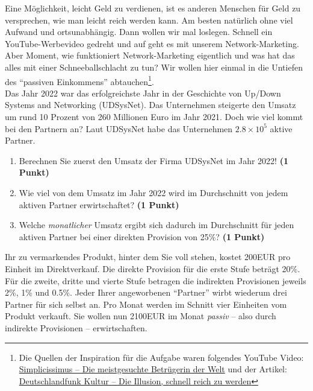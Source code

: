 \documentclass[a4paper, 9pt]{scrartcl}\usepackage[]{graphicx}\usepackage[]{xcolor}
\begin{document}
Eine M{\"o}glichkeit, leicht Geld zu verdienen, ist es anderen Menschen f{\"u}r Geld
zu versprechen, wie man leicht reich werden kann. Am besten nat{\"u}rlich ohne
viel Aufwand und ortsunabh{\"a}ngig. Dann wollen wir mal loslegen. Schnell
ein YouTube-Werbevideo gedreht und auf geht es mit unserem
Network-Marketing. Aber Moment, wie funktioniert Network-Marketing
eigentlich und was hat das alles mit einer Schneeballschlacht zu tun? Wir
wollen hier einmal in die Untiefen des "`passiven Einkommens"'
abtauchen\footnote{Die Quellen der Inspiration f{\"u}r die Aufgabe waren
  folgendes YouTube Video:
  \href{https://youtu.be/UOKkZF_qK9M?si=uf4foJVFKfeQMwSw}{Simplicissimus --
    Die meistgesuchte Betr{\"u}gerin der Welt} und der Artikel:
  \href{https://www.deutschlandfunkkultur.de/netzwerk-marketing-die-illusion-schnell-reich-zu-werden-100.html}{
    Deutschlandfunk Kultur -- Die Illusion, schnell reich zu werden}}.\\

Das Jahr 2022 war das erfolgreichste Jahr in der Geschichte von
Up/Down Systems and Networking (UDSysNet). Das Unternehmen steigerte den Umsatz um rund
10 Prozent von 260 Millionen Euro im Jahr
2021. Doch wie viel kommt bei den Partnern an? Laut
UDSysNet habe das Unternehmen \ensuremath{2.8\times 10^{5}} aktive Partner.

\begin{enumerate}
\item Berechnen Sie zuerst den Umsatz der Firma UDSysNet im
  Jahr 2022! \textbf{(1 Punkt)}
\item Wie viel von dem Umsatz im Jahr 2022 wird im Durchschnitt von jedem
  aktiven Partner erwirtschaftet? \textbf{(1 Punkt)}
\item Welche \textit{monatlicher} Umsatz ergibt sich dadurch im
  Durchschnitt f{\"u}r jeden aktiven Partner bei einer direkten Provision von
  25\%? \textbf{(1 Punkt)}
\end{enumerate}

Ihr zu vermarkendes Produkt, hinter dem Sie voll stehen, kostet
200EUR pro Einheit im Direktverkauf. Die direkte Provision
f{\"u}r die erste Stufe betr{\"a}gt 20\%. F{\"u}r die zweite, dritte und
vierte Stufe betragen die indirekten Provisionen jeweils 2\%,
1\% und 0.5\%. Jeder Ihrer angeworbenen "`Partner"'
wirbt wiederum drei Partner f{\"u}r sich selbst an. Pro Monat
werden im Schnitt vier Einheiten vom Produkt verkauft. Sie wollen nun
2100EUR im Monat \textit{passiv} -- also durch indirekte
Provisionen -- erwirtschaften.
\end{document}
